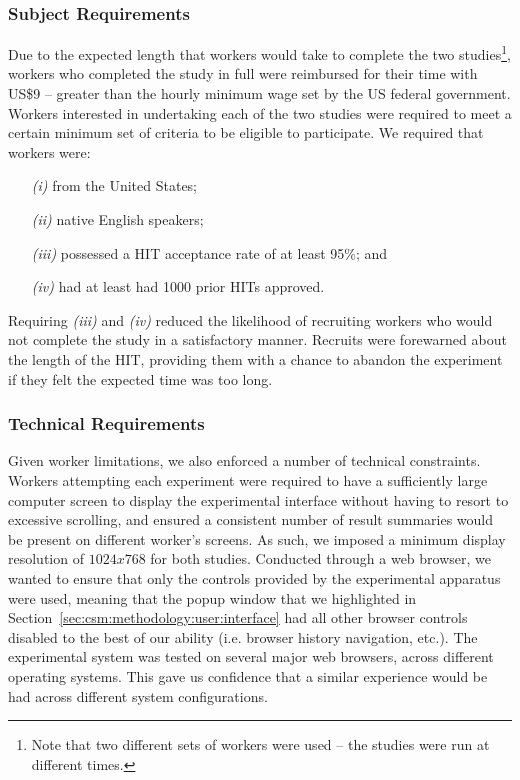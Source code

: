 \subsubsection{Subject Requirements}
Due to the expected length that workers would take to complete the two studies\footnote{Note that two different sets of workers were used -- the studies were run at different times.}, workers who completed the study in full were reimbursed for their time with US\$9 -- greater than the hourly minimum wage set by the US federal government. Workers interested in undertaking each of the two studies were required to meet a certain minimum set of criteria to be eligible to participate. We required that workers were:

\begin{itemize}
    \item[\emph{(i)}]{from the United States;}
    \item[\emph{(ii)}]{native English speakers;}
    \item[\emph{(iii)}]{possessed a HIT acceptance rate of at least 95\%; and}
    \item[\emph{(iv)}]{had at least had 1000 prior HITs approved.}
\end{itemize}

Requiring \emph{(iii)} and \emph{(iv)} reduced the likelihood of recruiting workers who would not complete the study in a satisfactory manner. Recruits were forewarned about the length of the HIT, providing them with a chance to abandon the experiment if they felt the expected time was too long.

\subsubsection{Technical Requirements}\label{sec:csm:methodology:user:crowdsourcing:technical}
Given worker limitations, we also enforced a number of technical constraints. Workers attempting each experiment were required to have a sufficiently large computer screen to display the experimental interface without having to resort to excessive scrolling, and ensured a consistent number of result summaries would be present on different worker's screens. As such, we imposed a minimum display resolution of $1024x768$ for both studies. Conducted through a web browser, we wanted to ensure that only the controls provided by the experimental apparatus were used, meaning that the popup window that we highlighted in Section~\ref{sec:csm:methodology:user:interface} had all other browser controls disabled to the best of our ability (i.e. browser history navigation, etc.). The experimental system was tested on several major web browsers, across different operating systems. This gave us confidence that a similar experience would be had across different system configurations.

